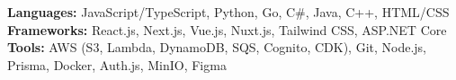 
\textbf{Languages:} JavaScript/TypeScript, Python, Go, C\#, Java, C++, HTML/CSS \\
\textbf{Frameworks:} React.js, Next.js, Vue.js, Nuxt.js, Tailwind CSS, ASP.NET Core \\
\textbf{Tools:} AWS (S3, Lambda, DynamoDB, SQS, Cognito, CDK), Git, Node.js, Prisma, Docker, Auth.js, MinIO, Figma

